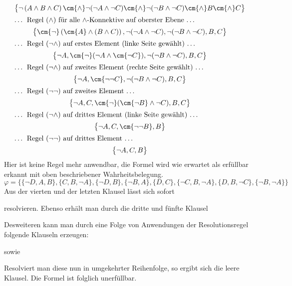 \begin{gather*}
    \big\{ \neg \left( A \wedge B \wedge C \right) \cm{\wedge} \neg (\neg A \wedge \neg C) \cm{\wedge} \neg (\neg B
          \wedge \neg C) \cm{\wedge} B \cm{\wedge} C \big\} \\
\intertext{… Regel $(\wedge)$ für alle $\wedge$-Konnektive auf oberster Ebene …}
    \big\{ \cm{\neg} \left( \cm{A} \wedge (B \wedge C) \right), \neg (\neg A \wedge \neg C), \neg (\neg B \wedge \neg
          C), B, C \big\} \\
\intertext{… Regel $(\neg\wedge)$ auf erstes Element (linke Seite gewählt) …}
    \big\{ \neg A, \cm{\neg} (\neg A \wedge \cm{\neg C}), \neg (\neg B \wedge \neg C), B, C \big\} \\
\intertext{… Regel $(\neg\wedge)$ auf zweites Element (rechte Seite gewählt) …}
    \big\{ \neg A, \cm{\neg \neg C}, \neg (\neg B \wedge \neg C), B, C \big\} \\
\intertext{… Regel $(\neg\neg)$ auf zweites Element …}
    \big\{ \neg A, C, \cm{\neg} (\cm{\neg B} \wedge \neg C), B, C \big\} \\
\intertext{… Regel $(\neg\wedge)$ auf drittes Element (linke Seite gewählt) …}
    \big\{ \neg A, C, \cm{\neg \neg B}, B \big\} \\
\intertext{… Regel $(\neg\neg)$ auf drittes Element …}
    \big\{ \neg A, C, B \big\}
\end{gather*}
Hier ist keine Regel mehr anwendbar, die Formel wird wie erwartet als erfüllbar erkannt mit oben beschriebener
Wahrheitsbelegung.
\vspace{-2em}
\[
 \varphi = \big\{ \{\neg D, A, B\}, \{C, B, \neg A\}, \{\neg D, B\}, \{\neg B, A\}, \{D, C\}, \{\neg C, B, \neg A\},
            \{D, B, \neg C\}, \{\neg B, \neg A\} \big\}
\]
Aus der vierten und der letzten Klausel lässt sich sofort
\begin{prooftree}
\end{prooftree}
resolvieren. Ebenso erhält man durch die dritte und fünfte Klausel
\begin{prooftree}
\end{prooftree}
Desweiteren kann man durch eine Folge von Anwendungen der Resolutionsregel folgende Klauseln erzeugen:
\begin{prooftree}
\end{prooftree}
sowie
\begin{prooftree}
\end{prooftree}
Resolviert man diese nun in umgekehrter Reihenfolge, so ergibt sich die leere Klausel. Die Formel ist folglich
unerfüllbar.

